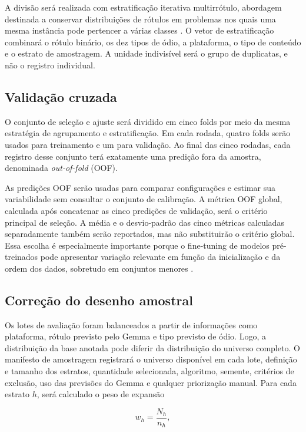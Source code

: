 A divisão será realizada com estratificação iterativa multirrótulo, abordagem
destinada a conservar distribuições de rótulos em problemas nos quais uma mesma
instância pode pertencer a várias classes \cite{sechidis2011stratification}. O
vetor de estratificação combinará o rótulo binário, os dez tipos de ódio, a
plataforma, o tipo de conteúdo e o estrato de amostragem. A unidade indivisível
será o grupo de duplicatas, e não o registro individual.

\subsection{Validação cruzada}

O conjunto de seleção e ajuste será dividido em cinco folds por meio da mesma
estratégia de agrupamento e estratificação. Em cada rodada, quatro folds serão
usados para treinamento e um para validação. Ao final das cinco rodadas, cada
registro desse conjunto terá exatamente uma predição fora da amostra,
denominada \textit{out-of-fold} (OOF).

As predições OOF serão usadas para comparar configurações e estimar sua
variabilidade sem consultar o conjunto de calibração. A métrica OOF global,
calculada após concatenar as cinco predições de validação, será o critério
principal de seleção. A média e o desvio-padrão das cinco métricas calculadas
separadamente também serão reportados, mas não substituirão o critério global.
Essa escolha é especialmente importante porque o
fine-tuning de modelos pré-treinados pode apresentar variação relevante em
função da inicialização e da ordem dos dados, sobretudo em conjuntos menores
\cite{dodge2020finetuning}.

\subsection{Correção do desenho amostral}

Os lotes de avaliação foram balanceados a partir de informações como plataforma,
rótulo previsto pelo Gemma e tipo previsto de ódio. Logo, a distribuição da
base anotada pode diferir da distribuição do universo completo. O manifesto de
amostragem registrará o universo disponível em cada lote, definição e tamanho
dos estratos, quantidade selecionada, algoritmo, semente, critérios de exclusão,
uso das previsões do Gemma e qualquer priorização manual. Para cada estrato $h$,
será calculado o peso de expansão

\begin{equation}
    w_h = \frac{N_h}{n_h},
\end{equation}

